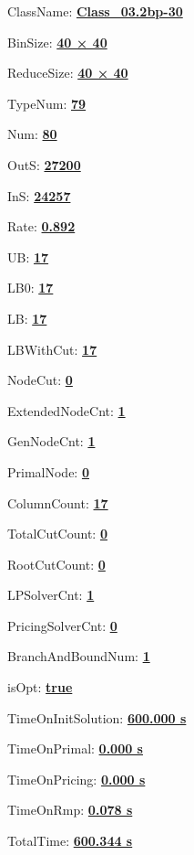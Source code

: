 \documentclass[11pt]{article}
\begin{document}
\pagestyle{empty}


ClassName: \underline{\textbf{Class_03.2bp-30}}
\par
BinSize: \underline{\textbf{40 × 40}}
\par
ReduceSize: \underline{\textbf{40 × 40}}
\par
TypeNum: \underline{\textbf{79}}
\par
Num: \underline{\textbf{80}}
\par
OutS: \underline{\textbf{27200}}
\par
InS: \underline{\textbf{24257}}
\par
Rate: \underline{\textbf{0.892}}
\par
UB: \underline{\textbf{17}}
\par
LB0: \underline{\textbf{17}}
\par
LB: \underline{\textbf{17}}
\par
LBWithCut: \underline{\textbf{17}}
\par
NodeCut: \underline{\textbf{0}}
\par
ExtendedNodeCnt: \underline{\textbf{1}}
\par
GenNodeCnt: \underline{\textbf{1}}
\par
PrimalNode: \underline{\textbf{0}}
\par
ColumnCount: \underline{\textbf{17}}
\par
TotalCutCount: \underline{\textbf{0}}
\par
RootCutCount: \underline{\textbf{0}}
\par
LPSolverCnt: \underline{\textbf{1}}
\par
PricingSolverCnt: \underline{\textbf{0}}
\par
BranchAndBoundNum: \underline{\textbf{1}}
\par
isOpt: \underline{\textbf{true}}
\par
TimeOnInitSolution: \underline{\textbf{600.000 s}}
\par
TimeOnPrimal: \underline{\textbf{0.000 s}}
\par
TimeOnPricing: \underline{\textbf{0.000 s}}
\par
TimeOnRmp: \underline{\textbf{0.078 s}}
\par
TotalTime: \underline{\textbf{600.344 s}}
\par
\newpage


\end{document}
